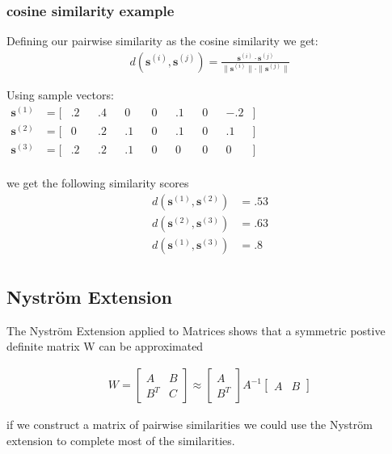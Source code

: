 \documentclass{article} %
\newcommand{\st}[1]{\textbf{s}^{(#1)}}
\newcommand{\pairsim}[1]{d(#1)}
\begin{document}
\subsubsection{cosine similarity example} \label{cosine}
Defining our pairwise similarity as the cosine similarity we get:
\begin{eqnarray}
	\pairsim{\st{i},\st{j}} = \frac{  \st{i} \cdot \st{j}  } {  \|\st{i} \| \cdot \|\st{j}\|  }
\end{eqnarray}

Using sample vectors:
\begin{align*}
\st{1} &= [&.2&	&.4& 	&0&	&0&	&.1& 	&0& &-.2& ]&&&&&&&&&&&&&&&&&&\\
\st{2} &= [&0&	&.2&	&.1&	&0&	&.1& 	&0& &.1& ] &&&&&&&&&&&&&&&&&&\\
\st{3} &= [&.2&	&.2& 	&.1&	&0&	&0&	&0&   &0& ]&&&&&&&&&&&&&&&&&&\\
\end{align*}

we get the following similarity scores 
\begin{eqnarray*}
\pairsim{\st{1},\st{2}} &= .53\\
\pairsim{\st{2},\st{3}} &= .63\\
\pairsim{\st{1},\st{3}} &= .8\\
\end{eqnarray*}

\subsection{Nystr\"om Extension}
The Nystr\"om Extension applied to Matrices \cite{fowlkes2004spectral} shows that a symmetric postive definite matrix W can be approximated

\begin{eqnarray}
	W = 
	\begin{bmatrix}
	   A      & B \\
	   B^T & C 
	\end{bmatrix}
	\approx
	\begin{bmatrix}
	    A   \\
	   B^T 
	\end{bmatrix}
	A^{-1}
	\begin{bmatrix}
	    A   &  B 
	\end{bmatrix}
\end{eqnarray}

if we construct a matrix of pairwise similarities we could use the Nystr\"om extension to complete most of the similarities. 
\end{document}
